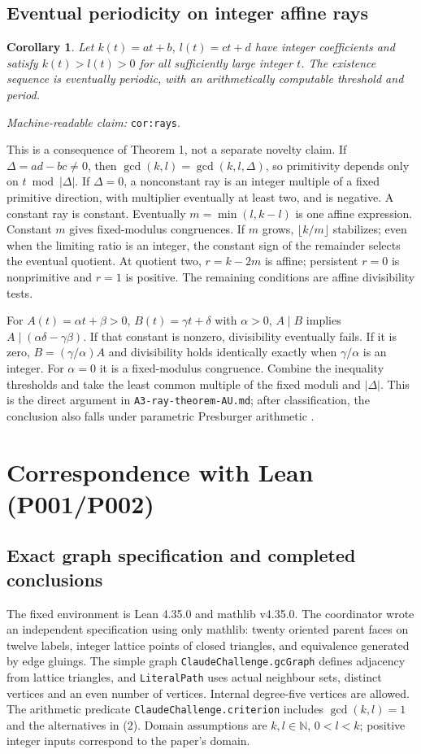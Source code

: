 \documentclass[11pt]{amsart}
\newcommand{\record}[1]{\nolinkurl{#1}}
\newtheorem{corollary}[theorem]{Corollary}
\newcommand{\claimid}[1]{\par\nopagebreak\noindent\textit{Machine-readable claim:} \record{#1}.\par}
\begin{document}
\subsection{Eventual periodicity on integer affine rays}
\begin{corollary}\label{cor:rays}
Let $k(t)=at+b$, $l(t)=ct+d$ have integer coefficients and satisfy
$k(t)>l(t)>0$ for all sufficiently large integer $t$. The existence
sequence is eventually periodic, with an arithmetically computable
threshold and period.
\end{corollary}
\claimid{cor:rays}
This is a consequence of Theorem 1, not a separate novelty claim.
If $\Delta=ad-bc\ne0$, then
$\gcd(k,l)=\gcd(k,l,\Delta)$, so primitivity depends only on
$t\bmod|\Delta|$. If $\Delta=0$, a nonconstant ray is an integer
multiple of a fixed primitive direction, with multiplier eventually
at least two, and is negative. A constant ray is constant.
Eventually $m=\min(l,k-l)$ is one affine expression. Constant $m$
gives fixed-modulus congruences. If $m$ grows, $\lfloor k/m\rfloor$
stabilizes; even when the limiting ratio is an integer, the constant
sign of the remainder selects the eventual quotient. At quotient two,
$r=k-2m$ is affine; persistent $r=0$ is nonprimitive and $r=1$ is
positive. The remaining conditions are affine divisibility tests.

For $A(t)=\alpha t+\beta>0$, $B(t)=\gamma t+\delta$ with
$\alpha>0$, $A\mid B$ implies $A\mid(\alpha\delta-\gamma\beta)$.
If that constant is nonzero, divisibility eventually fails. If it is
zero, $B=(\gamma/\alpha)A$ and divisibility holds identically exactly
when $\gamma/\alpha$ is an integer. For $\alpha=0$ it is a
fixed-modulus congruence. Combine the inequality thresholds and take
the least common multiple of the fixed moduli and $|\Delta|$.
This is the direct argument in \record{A3-ray-theorem-AU.md}; after
classification, the conclusion also falls under parametric Presburger
arithmetic \cite{BGW}.

\section{Correspondence with Lean (P001/P002)}\label{sec:lean}
\subsection{Exact graph specification and completed conclusions}
The fixed environment is Lean 4.35.0 and mathlib v4.35.0. The
coordinator wrote an independent specification using only mathlib:
twenty oriented parent faces on twelve labels, integer lattice points
of closed triangles, and equivalence generated by edge gluings.
The simple graph \record{ClaudeChallenge.gcGraph} defines adjacency
from lattice triangles, and \record{LiteralPath} uses actual neighbour
sets, distinct vertices and an even number of vertices. Internal
degree-five vertices are allowed. The arithmetic predicate
\record{ClaudeChallenge.criterion} includes $\gcd(k,l)=1$ and the
alternatives in (2). Domain assumptions are $k,l\in\mathbb N$,
$0<l<k$; positive integer inputs correspond to the paper's domain.
\end{document}
